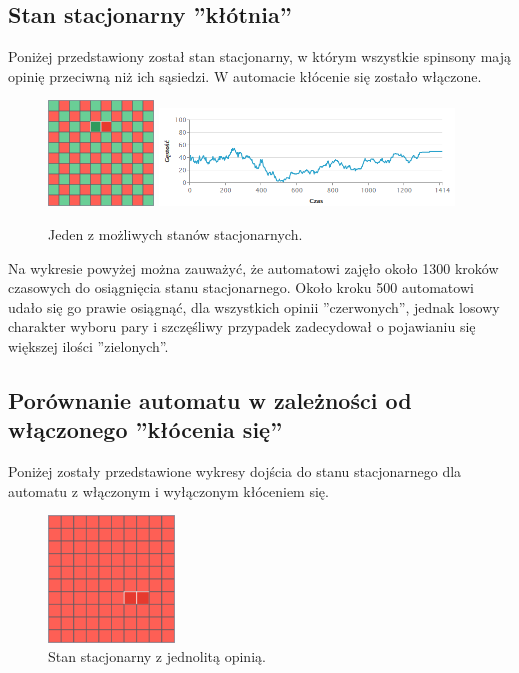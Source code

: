 \documentclass[12pt]{article}
\begin{document}
\subsection{Stan stacjonarny ''kłótnia''}

Poniżej przedstawiony został stan stacjonarny, w którym wszystkie spinsony mają opinię przeciwną niż ich sąsiedzi. W automacie kłócenie się zostało włączone.

\begin{figure}[H]
\centering
\includegraphics[width=0.25\textwidth]{stacjonarny_klocenie.png} 
\includegraphics[width=0.7\textwidth]{stacjonarny_klocenie_wykres.png}
\caption{Jeden z możliwych stanów stacjonarnych. }
\end{figure}

Na wykresie powyżej można zauważyć, że automatowi zajęło około 1300 kroków czasowych do osiągnięcia stanu stacjonarnego. Około kroku 500 automatowi udało się go prawie osiągnąć, dla wszystkich opinii ''czerwonych'', jednak losowy charakter wyboru pary i szczęśliwy przypadek zadecydował o pojawianiu się większej ilości ''zielonych''.

\subsection{Porównanie automatu w zależności od włączonego ''kłócenia się''}

Poniżej zostały przedstawione wykresy dojścia do stanu stacjonarnego dla automatu z włączonym i wyłączonym kłóceniem się.

\begin{figure}[H]
\centering
\includegraphics[width=0.3\textwidth]{stacjonarny_niezgoda.png}
\caption{Stan stacjonarny z jednolitą opinią. }
\end{figure}
\end{document}
